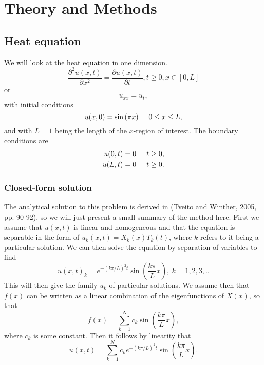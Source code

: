 \section{Theory and Methods}

\subsection{Heat equation}
We will look at the heat equation in one dimension.
\begin{equation}
    \frac{\partial^2 u(x,t)}{\partial x^2} =\frac{\partial u(x,t)}{\partial t},
    t\geq 0, x\in [0,L]
\end{equation}
or
\begin{equation}\label{eq:heat_eq}
    u_{xx} = u_t,
\end{equation}
with initial conditions
\begin{equation}\label{eq:boundary_x}
    u(x,0)= \sin{(\pi x)} \hspace{0.5cm} 0 \leq x \leq L,
\end{equation}
and with $L=1$ being the length of the $x$-region of interest. The 
boundary conditions are
\begin{align}\label{eq:boundary_t}
    u(0,t) &= 0 \hspace{0.5cm} t \ge 0,\\
    u(L,t) &= 0 \hspace{0.5cm} t \ge 0.
\end{align}

\subsubsection{Closed-form solution}
The analytical solution to this problem is derived in (Tveito and
Winther, 2005, pp. 90-92)\cite{1}, so we will just present a small
summary of the method here. First we assume that $u(x,t)$ is linear and homogeneous and 
that the equation is separable in the form of $u_k(x,t)=X_k(x)T_k(t)$, where
$k$ refers to it being a particular solution. We can then solve the equation 
by separation of variables to find
\begin{equation*}
    u(x,t)_k=e^{-(k\pi/L)^2t}\sin{\left(\frac{k\pi}{L}x\right)},\ k=1,2,3,..
\end{equation*}
This will then give the family ${u_k}$ of particular solutions. We assume then
that $f(x)$ can be written as a linear combination of the eigenfunctions of
$X(x)$, so that
\begin{equation*}
    f(x)=\sum_{k=1}^{N} c_k \sin{\left(\frac{k\pi}{L}x\right)},
\end{equation*}
where $c_k$ is some constant. Then it follows by linearity that
\begin{equation*}
u(x,t)=\sum_{k=1}^N c_ke^{-(k\pi/L)^2t}\sin{\left(\frac{k\pi}{L}x\right)}.
\end{equation*}

